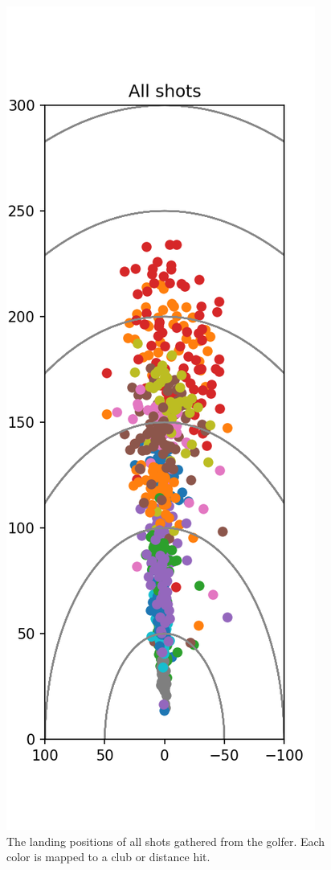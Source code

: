 \documentclass{kththesis}
\begin{document}
\begin{figure}
    \centering
    \includegraphics[height=0.5\textheight]{Shots/all_shots.png}
    \caption{The landing positions of all shots gathered from the golfer. Each color is mapped to a club or distance hit.}
    \label{fig:all_shots}
\end{figure}
\end{document}
